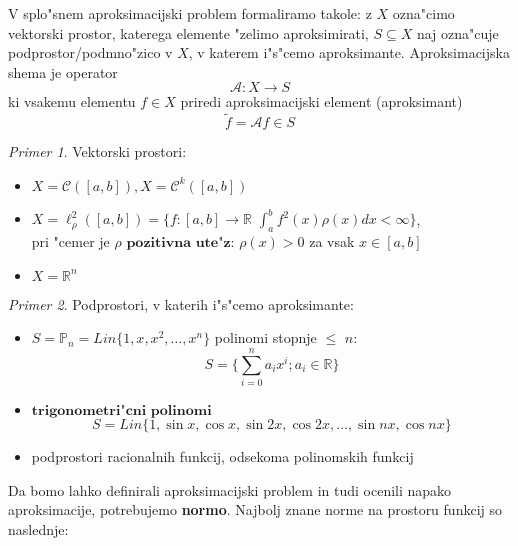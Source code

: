 \documentclass[a4paper,12pt]{article}
\theoremstyle{definition}
\theoremstyle{remark}
\newtheorem*{ex}{Primer}
\newcommand{\R}{\mathbb{R}}
\newcommand{\Pp}{\mathbb{P}}
\begin{document}
V splo"snem aproksimacijski problem formaliramo takole: z $X$ ozna"cimo vektorski prostor, katerega elemente "zelimo aproksimirati, $S \subseteq X$ naj ozna"cuje podprostor/podmno"zico v $X$,
v katerem i"s"cemo aproksimante. Aproksimacijska shema je operator 
\begin{equation*}
    \mathscr{A}\colon X \to S
\end{equation*}
ki vsakemu elementu $f \in X$ priredi aproksimacijski element (aproksimant)
\begin{equation*}
    \tilde{f} = \mathscr{A} f \in S
\end{equation*}

\begin{ex}
    Vektorski prostori:
    \begin{itemize}
        \item $X = \mathscr{C}([a, b]), X = \mathscr{C}^k([a, b])$
        \item $X = \ell^{2}_{\rho}([a, b]) = \{f\colon[a, b] \to \R$ $\int_{a}^{b} f^2(x)\rho(x) dx < \infty \}$,\\
        pri "cemer je $\rho \textbf{ pozitivna ute"z: } \rho (x) > 0$ za vsak $x \in [a, b]$
        \item $X = \R ^n$
    \end{itemize}
\end{ex}

\begin{ex}
    Podprostori, v katerih i"s"cemo aproksimante:
    
    \begin{itemize}
        \item $S = \Pp_n = Lin\{1, x, x^2, \dots, x^n\}$ polinomi stopnje $\leq$ $n$:
        \begin{equation*}
            S = \{ \sum_{i = 0}^{n} a_i x^i; a_i \in \R \}
        \end{equation*}
        \item $\textbf{trigonometri"cni polinomi}$
        \begin{equation*}
            S = Lin\{1, \sin x, \cos x, \sin 2x, \cos 2x, \dots, \sin nx, \cos nx\}
        \end{equation*}
        \item podprostori racionalnih funkcij, odsekoma polinomskih funkcij
    \end{itemize}
\end{ex}

Da bomo lahko definirali aproksimacijski problem in tudi ocenili napako aproksimacije, potrebujemo \textbf{normo}. Najbolj znane norme na prostoru funkcij so naslednje:
\end{document}
